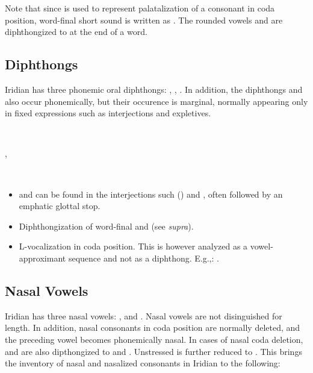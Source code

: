 Note that since  is used to represent palatalization of a consonant in coda position, word-final short  sound is written as . The rounded vowels  and \bt{\oe~\o:} are diphthongized to  at the end of a word.

\subsection{Diphthongs}
Iridian has three phonemic oral diphthongs:  ,  \nt{\dte},  \nt{\dto}. In addition, the diphthongs   and   also occur phonemically, but their occurence is marginal, normally appearing only in fixed expressions such as interjections and expletives.

\ex
{} \\
\xe

\ex
{}, \\
\xe

\ex
{} \\
\xe

\begin{itemize}
	\item {} and  can be found in the interjections such   () and   , often followed by an emphatic glottal stop.
	\item Diphthongization of word-final  and \nt{\oe~\o:} (see \textit{supra}).
	\item L-vocalization in coda position. This is however analyzed as a vowel-approximant sequence and not as a diphthong. E.g.,:   .
\end{itemize}

\subsection{Nasal Vowels}
Iridian has three nasal vowels:  ,   and  . Nasal vowels are not disinguished for length. In addition, nasal consonants in coda position are normally deleted, and the preceding vowel becomes phonemically nasal. In cases of nasal coda deletion,   and   are also dipthongized to  and . Unstressed  is further reduced to . This brings the inventory of nasal and nasalized consonants in Iridian to the following: 

